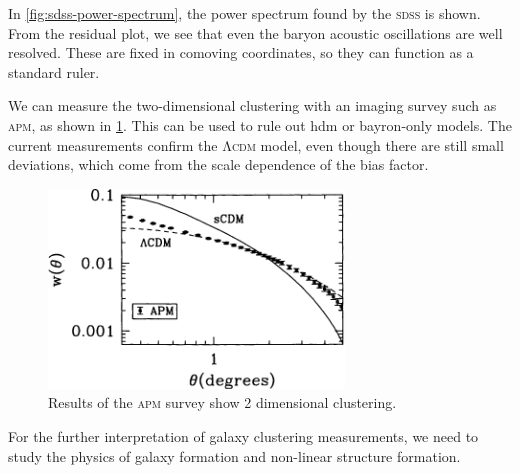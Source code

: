 In \cref{fig:sdss-power-spectrum}, the power spectrum found by the \textsc{sdss} is shown.
From the residual plot, we see that even the baryon acoustic oscillations are well resolved.
These are fixed in comoving coordinates, so they can function as a standard ruler.

We can measure the two-dimensional clustering with an imaging survey such as \textsc{apm}, as shown in \cref{fig:apm}.
This can be used to rule out \ac{hdm} or bayron-only models.
The current measurements confirm the \textsc{Λcdm} model, even though there are still small deviations, which come from the scale dependence of the bias factor.
\begin{figure}
	\centering
	\includegraphics[width=0.7\textwidth]{img/ch-03/apm.pdf}
	\caption{Results of the \textsc{apm} survey show 2 dimensional clustering.}
	\label{fig:apm}
\end{figure}

For the further interpretation of galaxy clustering measurements, we need to study the physics of galaxy formation and non-linear structure formation.

